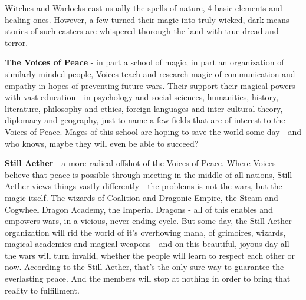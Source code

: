 \documentclass[a4paper,11pt]{article}
\begin{document}
Witches and Warlocks cast usually the spells of nature, 4 basic elements and healing ones. However, a few turned their magic into truly wicked, dark means - stories of such casters are whispered thorough the land with true dread and terror.

\textbf{The Voices of Peace} - in part a school of magic, in part an organization of similarly-minded people, Voices teach and research magic of communication and empathy in hopes of preventing future wars. Their support their magical powers with vast education - in psychology and social sciences, humanities, history, literature, philosophy and ethics, foreign languages and inter-cultural theory, diplomacy and geography, just to name a few fields that are of interest to the Voices of Peace. Mages of this school are hoping to save the world some day - and who knows, maybe they will even be able to succeed?

\textbf{Still Aether} - a more radical offshot of the Voices of Peace. Where Voices believe that peace is possible through meeting in the middle of all nations, Still Aether views things vastly differently - the problems is not the wars, but the magic itself. The wizards of Coalition and Dragonic Empire, the Steam and Cogwheel Dragon Academy, the Imperial Dragons - all of this enables and empowers wars, in a vicious, never-ending cycle. But some day, the Still Aether organization will rid the world of it's overflowing mana, of grimoires, wizards, magical academies and magical weapons - and on this beautiful, joyous day all the wars will turn invalid, whether the people will learn to respect each other or now. According to the Still Aether, that's the only sure way to guarantee the everlasting peace. And the members will stop at nothing in order to bring that reality to fulfillment. 
\end{document}
